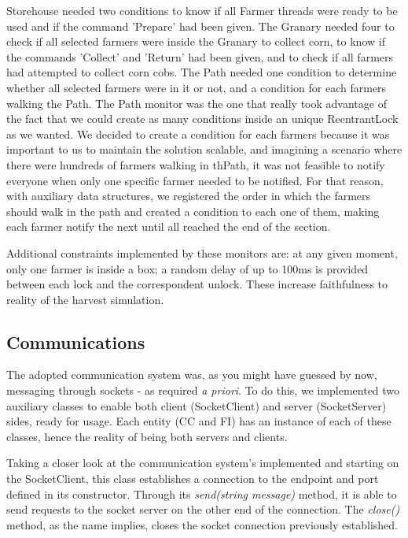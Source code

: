 \documentclass[12pt]{article}
\begin{document}
Storehouse needed two conditions to know if all Farmer threads were ready to be used and if the command 'Prepare' had been given.
The Granary needed four to check if all selected farmers were inside the Granary to collect corn, to know if the commands 'Collect' and 'Return' had 
been given, and to check if all farmers had attempted to collect corn cobs.
The Path needed one condition to determine whether all selected farmers were in it or not, and a condition for each farmers walking the Path. The Path monitor was the one that really took advantage of the fact that we could create as many conditions inside an unique ReentrantLock as we wanted. We decided to create a condition for each farmers because it was important to us to maintain the solution scalable, and imagining a scenario where there were hundreds of farmers walking in thPath, it was not feasible to notify everyone when only one specific farmer needed to be notified. For that reason, with auxiliary data structures, we registered the order in which the farmers should walk in the path and created a condition to each one of them, making each farmer notify the next until all reached the end of the section.

Additional constraints implemented by these monitors are: at any given moment, only one farmer is inside a box; a random delay of up to 100ms is provided 
between each lock and the correspondent unlock.
These increase faithfulness to reality of the harvest simulation.

\subsection{Communications} \label{communications} %

The adopted communication system was, as you might have guessed by now, messaging through sockets - as required \textit{a priori}. %
To do this, we implemented two auxiliary classes to enable both client (SocketClient) and server (SocketServer) sides, ready for usage. 
Each entity (CC and FI) has an instance of each of these classes, hence the reality of being both servers and clients.

Taking a closer look at the communication system's implemented and starting on the SocketClient, this class establishes a connection to the endpoint and port 
defined in its constructor.
Through its \textit{send(string message)} method, it is able to send requests to the socket server on the other end of the connection.
The \textit{close()} method, as the name implies, closes the socket connection previously established.
\end{document}

